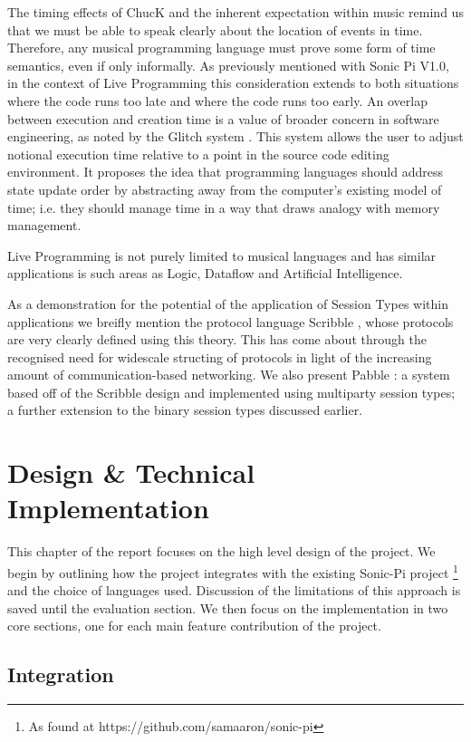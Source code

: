 \documentclass[11pt]{scrartcl}
\begin{document}
The timing effects of ChucK and the inherent expectation within music remind 
us that we must be able to speak clearly about the location of events in time. 
Therefore, any musical programming language must prove some form of time 
semantics, even if only informally. As previously mentioned with Sonic Pi 
V1.0, in the context of Live Programming this consideration extends to both 
situations where the code runs too late and where the code runs too early. An 
overlap between execution and creation time is a value of broader concern in 
software engineering, as noted by the Glitch system \cite{ME14}. This system 
allows the user to adjust notional execution time relative to a point in the 
source code editing environment. It proposes the idea that programming 
languages should address state update order by abstracting away from the 
computer's existing model of time; i.e. they should manage time in a way that 
draws analogy with memory management. 

Live Programming is not purely limited to musical languages and has similar 
applications is such areas as Logic, Dataflow and Artificial Intelligence.

As a demonstration for the potential of the application of Session Types 
within applications we breifly mention the protocol language Scribble 
\cite{HMBCY11}, whose protocols are very clearly defined using this theory. 
This has come about through the recognised need for widescale structing of 
protocols in light of the increasing amount of communication-based networking. 
We also present Pabble \cite{NY14}: a system based off of the Scribble design 
and implemented using multiparty session types; a further extension to the 
binary session types discussed earlier.
\newpage

\section{Design \& Technical Implementation}
This chapter of the report focuses on the high level design of the project.
We begin by outlining how the project integrates with the existing Sonic-Pi
project \footnote{As found at https://github.com/samaaron/sonic-pi} and the 
choice of languages used. Discussion of the limitations of this approach is 
saved until the evaluation section. We then focus on the implementation in 
two core sections, one for each main feature contribution of the project.

\subsection{Integration}
\end{document}
